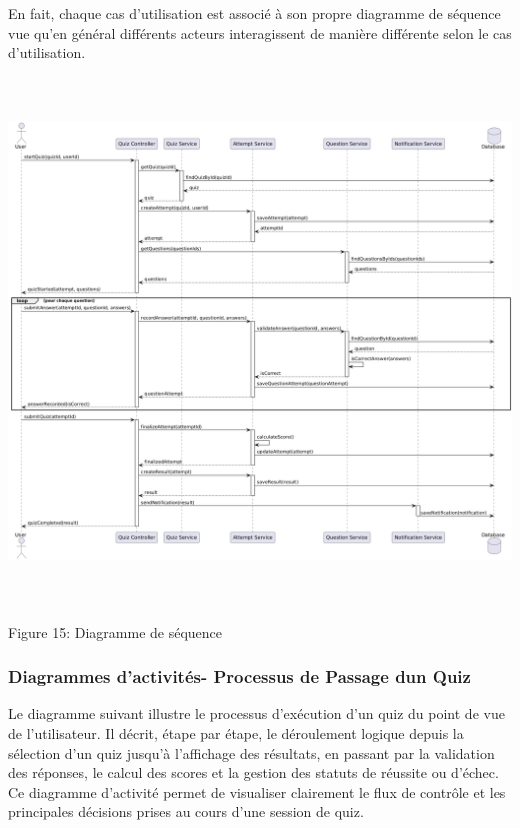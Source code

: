 \documentclass[12pt,a4paper,twoside]{report}
\begin{document}
En fait, chaque cas d'utilisation est associé à son propre diagramme de
séquence vue qu'en général différents acteurs interagissent de manière
différente selon le cas d'utilisation.~~

\includegraphics[width=6.3in,height=5.4916in]{latex_media/media/image19.png}

\protect\hypertarget{_Toc203823427}{}{}Figure 15: Diagramme de séquence

\hypertarget{diagrammes-dactivituxe9s--processus-de-passage-dun-quiz}{%
\subsubsection{Diagrammes d'activités- Processus de Passage
d\textquotesingle un
Quiz}\label{diagrammes-dactivituxe9s--processus-de-passage-dun-quiz}}

Le diagramme suivant illustre le processus d'exécution d'un quiz du
point de vue de l'utilisateur. Il décrit, étape par étape, le
déroulement logique depuis la sélection d'un quiz jusqu'à l'affichage
des résultats, en passant par la validation des réponses, le calcul des
scores et la gestion des statuts de réussite ou d'échec. Ce diagramme
d'activité permet de visualiser clairement le flux de contrôle et les
principales décisions prises au cours d'une session de quiz.
\end{document}
